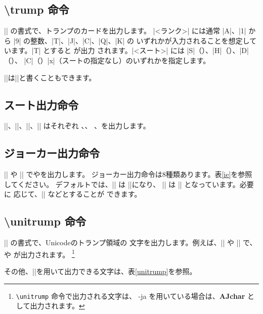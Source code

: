 \documentclass{jlreq}
\begin{document}
\subsection{\textbackslash trump 命令}
|| の書式で、トランプのカードを出力します。
|<ランク>| には通常 |A|、|1| から |9| の整数、|T|、|J|、|C|、|Q|、|K| の
いずれかが入力されることを想定しています。|T| とすると
{}が出力
されます。|<スート>| には |S|（\hmS）、|H|（\hmH）、|D|（\hmD）、
|C|（\hmC）|x|（スートの指定なし）のいずれかを指定します。

||は||と書くこともできます。

\subsection{スート出力命令}
|\hmS|、|\hmH|、|\hmD|、|\hmC| はそれぞれ \hmS、\hmH、
\hmD、\hmC を出力します。

\subsection{ジョーカー出力命令}
|\JOKER| や |\joker| で\JOKER や\joker を出力します。
ジョーカー出力命令は8種類あります。表\ref{ie}を参照してください。
デフォルトでは、|\JOKER| は |\BLACKJOKER|になり、
|\joker| は |\blackjoker| となっています。必要に
応じて、|\renewcommand{\joker}{\whitejoker}| などとすることが
できます。

\subsection{\textbackslash unitrump 命令}
|| の書式で、Unicodeのトランプ領域の
文字を出力します。例えば、|| や || で、
 や  が出力されます。
\footnote{\texttt{\textbackslash unitrump} 命令で出力される文字は、
\LuaLaTeX-ja を用いている場合は、\textbf{AJchar} として出力されます。}

その他、|\unitrump|を用いて出力できる文字は、表\ref{unitrump}を参照。
\end{document}
